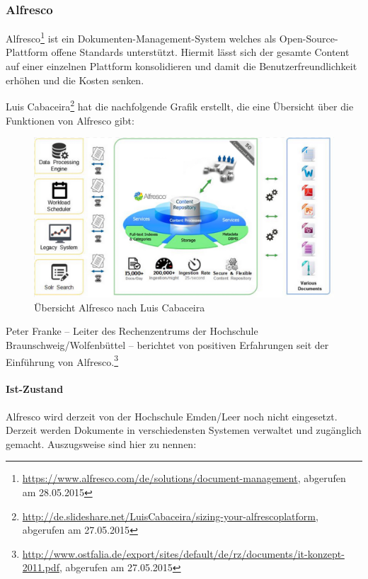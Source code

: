 \subsubsection{Alfresco}
\label{subsubsection_migration_alfresco}
Alfresco\footnote{\url{https://www.alfresco.com/de/solutions/document-management}, abgerufen am 28.05.2015} ist ein Dokumenten-Management-System welches als Open-Source-Plattform offene Standards unterstützt. Hiermit lässt sich der gesamte Content auf einer einzelnen Plattform konsolidieren und damit die Benutzerfreundlichkeit erhöhen und die Kosten senken.

Luis Cabaceira\footnote{\url{http://de.slideshare.net/LuisCabaceira/sizing-your-alfrescoplatform}, abgerufen am 27.05.2015} hat die nachfolgende Grafik erstellt, die eine Übersicht über die Funktionen von Alfresco gibt:

\begin{figure}[h!]
	\centering
	\includegraphics[width=\textwidth]
	{kapitel/gruppe4_1/bilder/uebersicht_alfresco}
	\caption{Übersicht Alfresco nach Luis Cabaceira}
	\label{fig_uebersicht_alfresco}
\end{figure}

Peter Franke – Leiter des Rechenzentrums der Hochschule Braunschweig/Wolfenbüttel – berichtet von positiven Erfahrungen seit der Einführung von Alfresco.\footnote{\url{http://www.ostfalia.de/export/sites/default/de/rz/documents/it-konzept-2011.pdf}, abgerufen am 27.05.2015}

\paragraph{Ist-Zustand}
Alfresco wird derzeit von der Hochschule Emden/Leer noch nicht eingesetzt. Derzeit werden Dokumente in verschiedensten Systemen verwaltet und zugänglich gemacht. Auszugsweise sind hier zu nennen:

